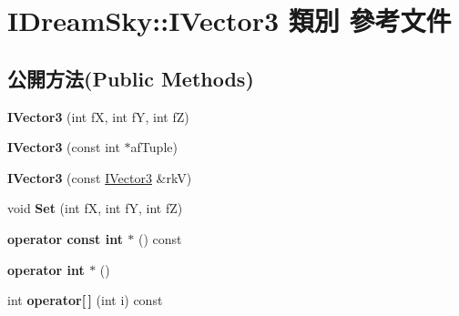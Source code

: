 \hypertarget{class_i_dream_sky_1_1_i_vector3}{}\section{I\+Dream\+Sky\+:\+:I\+Vector3 類別 參考文件}
\label{class_i_dream_sky_1_1_i_vector3}
\subsection*{公開方法(Public Methods)}
\begin{DoxyCompactItemize}
\item 
{\bfseries I\+Vector3} (int fX, int fY, int fZ)\hypertarget{class_i_dream_sky_1_1_i_vector3_a50bda485a1ae88e2a1a709439d7bab21}{}\label{class_i_dream_sky_1_1_i_vector3_a50bda485a1ae88e2a1a709439d7bab21}

\item 
{\bfseries I\+Vector3} (const int $\ast$af\+Tuple)\hypertarget{class_i_dream_sky_1_1_i_vector3_a586151fd5869e5405df7a33e8c3dfab1}{}\label{class_i_dream_sky_1_1_i_vector3_a586151fd5869e5405df7a33e8c3dfab1}

\item 
{\bfseries I\+Vector3} (const \hyperlink{class_i_dream_sky_1_1_i_vector3}{I\+Vector3} \&rkV)\hypertarget{class_i_dream_sky_1_1_i_vector3_a3ea636c736b94a2f1829c8e31aa053b7}{}\label{class_i_dream_sky_1_1_i_vector3_a3ea636c736b94a2f1829c8e31aa053b7}

\item 
void {\bfseries Set} (int fX, int fY, int fZ)\hypertarget{class_i_dream_sky_1_1_i_vector3_a8c8ecca8ed59ff79da4e8b036271166b}{}\label{class_i_dream_sky_1_1_i_vector3_a8c8ecca8ed59ff79da4e8b036271166b}

\item 
{\bfseries operator const int $\ast$} () const \hypertarget{class_i_dream_sky_1_1_i_vector3_a70d841021d8ff82735271a664c5b09af}{}\label{class_i_dream_sky_1_1_i_vector3_a70d841021d8ff82735271a664c5b09af}

\item 
{\bfseries operator int $\ast$} ()\hypertarget{class_i_dream_sky_1_1_i_vector3_a5d2ea45bb81e2ac814943761a1c689f2}{}\label{class_i_dream_sky_1_1_i_vector3_a5d2ea45bb81e2ac814943761a1c689f2}

\item 
int {\bfseries operator\mbox{[}$\,$\mbox{]}} (int i) const \hypertarget{class_i_dream_sky_1_1_i_vector3_a55f507819087753afc80f5849b1a4a26}{}\label{class_i_dream_sky_1_1_i_vector3_a55f507819087753afc80f5849b1a4a26}


\end{DoxyCompactItemize}
